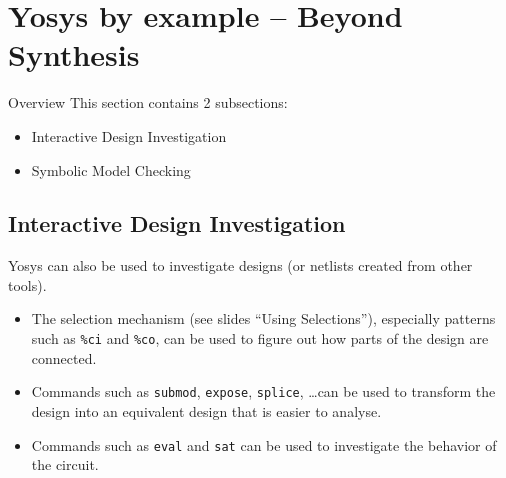 
\section{Yosys by example -- Beyond Synthesis}

\begin{frame}
\sectionpage
\end{frame}

\begin{frame}{Overview}
This section contains 2 subsections:
\begin{itemize}
\item Interactive Design Investigation
\item Symbolic Model Checking
\end{itemize}
\end{frame}


\subsection{Interactive Design Investigation}

\begin{frame}
\subsectionpage
\subsectionpagesuffix
\end{frame}

\begin{frame}{\subsecname}
Yosys can also be used to investigate designs (or netlists created
from other tools).

\begin{itemize}
\item
The selection mechanism (see slides ``Using Selections''), especially patterns such
as {\tt \%ci} and {\tt \%co}, can be used to figure out how parts of the design
are connected.

\item
Commands such as {\tt submod}, {\tt expose}, {\tt splice}, \dots can be used
to transform the design into an equivalent design that is easier to analyse.

\item
Commands such as {\tt eval} and {\tt sat} can be used to investigate the
behavior of the circuit.
\end{itemize}
\end{frame}

